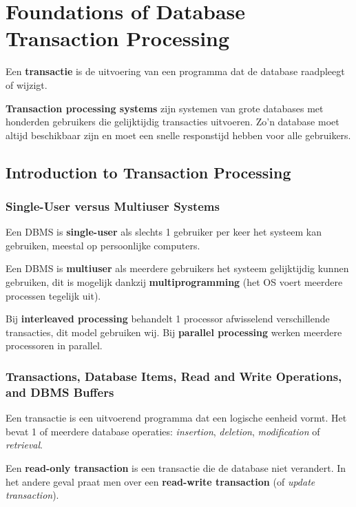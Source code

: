 \chapter{Foundations of Database Transaction Processing}
Een \textbf{transactie} is de uitvoering van een programma dat de database raadpleegt of wijzigt.

\textbf{Transaction processing systems} zijn systemen van grote databases met honderden gebruikers die gelijktijdig transacties uitvoeren. Zo'n database moet altijd beschikbaar zijn en moet een snelle responstijd hebben voor alle gebruikers.



\section{Introduction to Transaction Processing}
\subsection{Single-User versus Multiuser Systems}
Een DBMS is \textbf{single-user} als slechts 1 gebruiker per keer het systeem kan gebruiken, meestal op persoonlijke computers.

Een DBMS is \textbf{multiuser} als meerdere gebruikers het systeem gelijktijdig kunnen gebruiken, dit is mogelijk dankzij \textbf{multiprogramming} (het OS voert meerdere processen tegelijk uit).

Bij \textbf{interleaved processing} behandelt 1 processor afwisselend verschillende transacties, dit model gebruiken wij. Bij \textbf{parallel processing} werken meerdere processoren in parallel.


\subsection[Transactions, Database Items, Read and Write Operations, and DBMS Buffers]{Transactions, Database Items, Read and Write Operations,\\and DBMS Buffers}
Een transactie is een uitvoerend programma dat een logische eenheid vormt. Het bevat 1 of meerdere database operaties: \textit{insertion}, \textit{deletion}, \textit{modification} of \textit{retrieval}.

Een \textbf{read-only transaction} is een transactie die de database niet verandert. In het andere geval praat men over een \textbf{read-write transaction} (of \textit{update transaction}).

~

